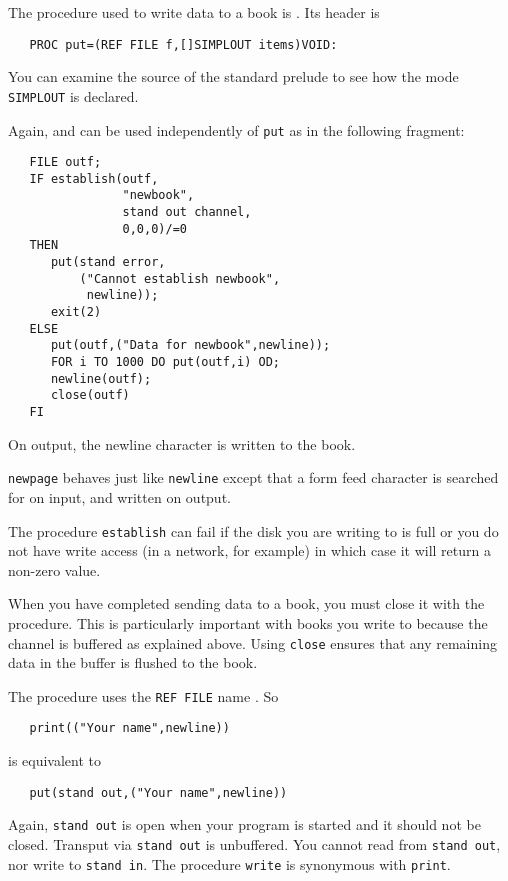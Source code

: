 The procedure used to write data to a book is . Its header
is
\begin{verbatim}
   PROC put=(REF FILE f,[]SIMPLOUT items)VOID:
\end{verbatim}
\noindent
You can examine the source of the standard prelude to see how the
mode \verb|SIMPLOUT| is declared.

Again,  and  can be used independently of
\verb|put| as in the following fragment:
\begin{verbatim}
   FILE outf;
   IF establish(outf,
                "newbook",
                stand out channel,
                0,0,0)/=0
   THEN
      put(stand error,
          ("Cannot establish newbook",
           newline));
      exit(2)
   ELSE
      put(outf,("Data for newbook",newline));
      FOR i TO 1000 DO put(outf,i) OD;
      newline(outf);
      close(outf)
   FI
\end{verbatim}
\noindent
On output, the newline character is written to the book.

\verb|newpage| behaves just like \verb|newline| except that a form
feed character is searched for on input, and written on output.

The procedure \verb|establish| can fail if the disk you are writing to
is full or you do not have write access (in a network, for example) in
which case it will return a non-zero value.

When you have completed sending data to a book, you must close it
with the  procedure. This is particularly important with
books you write to because the channel is buffered as explained
above. Using \verb|close| ensures that any remaining data in the
buffer is flushed to the book.

The procedure  uses the \verb|REF FILE| name
. So
\begin{verbatim}
   print(("Your name",newline))
\end{verbatim}
\noindent
is equivalent to
\begin{verbatim}
   put(stand out,("Your name",newline))
\end{verbatim}
\noindent
Again, \verb|stand out| is open when your program is started and it
should not be closed. Transput via \verb|stand out| is unbuffered.
You cannot read from \verb|stand out|, nor write to \verb|stand in|.
The procedure \verb|write| is synonymous with \verb|print|.

